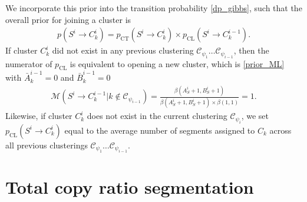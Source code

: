 \documentclass[10pt,letter]{article}
\numberwithin{equation}{section}
\begin{document}
We incorporate this prior into the transition probability \eqref{dp_gibbs}, such that the overall prior for joining a cluster is
\begin{align*}
p(S^i\to C^i_k) = p_\text{CT}(S^i\to C^i_k)\times p_\text{CL}(S^i \to C^{i-1}_k).
\end{align*}
If cluster $C^i_k$ did not exist in any previous clustering $\mathcal{C}_{\psi_1}\dots \mathcal{C}_{\psi_{i-1}}$, then the numerator of $p_\text{CL}$ is equivalent to opening a new cluster, which is \eqref{prior_ML} with $\bar A^{i-1}_k=0$ and $\bar B^{i-1}_k=0$
\begin{align*}
\mathcal{M}(S^i\to C^{i-1}_k|k\notin \mathcal{C}_{\psi_{i-1}}) = \frac{\beta(A^i_S + 1, B^i_S + 1)}{\beta(A^i_S + 1, B^i_S + 1)\times\beta(1,1)}=1.
\end{align*}
Likewise, if cluster $C^i_k$ does not exist in the current clustering $\mathcal{C}_{\psi_i}$, we set $p_\text{CL}(S^i\to C^i_k)$ equal to the average number of segments assigned to $C_k$ across all previous clusterings $\mathcal{C}_{\psi_1}\dots \mathcal{C}_{\psi_{i-1}}$.



%
%
%

\section{Total copy ratio segmentation}
\end{document}
